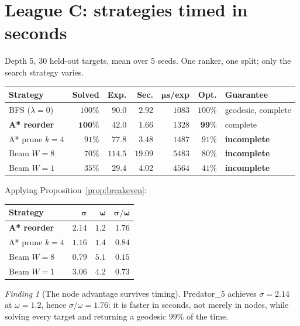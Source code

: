 \documentclass[11pt]{article}
\theoremstyle{plain}
\theoremstyle{definition}
\theoremstyle{remark}
\newtheorem{finding}{Finding}
\begin{document}
\section{League C: strategies timed in seconds}
\label{sec:leagueC}

Depth 5, 30 held-out targets, mean over 5 seeds. One ranker, one split; only the
search strategy varies.

\begin{center}
\small
\begin{tabular}{lrrrrrl}
\toprule
\textbf{Strategy} & \textbf{Solved} & \textbf{Exp.} & \textbf{Sec.} &
$\boldsymbol{\mu s}$\textbf{/exp} & \textbf{Opt.} & \textbf{Guarantee} \\
\midrule
BFS ($\lambda=0$) & $100\%$ & $90.0$ & $2.92$ & $1083$ & $100\%$ & geodesic, complete \\
\textbf{A* reorder} & $\mathbf{100\%}$ & $\mathbf{42.0}$ & $\mathbf{1.66}$ &
$1328$ & $\mathbf{99\%}$ & complete \\
A* prune $k{=}4$ & $91\%$ & $77.8$ & $3.48$ & $1487$ & $91\%$ & \textbf{incomplete} \\
Beam $W{=}8$ & $70\%$ & $114.5$ & $19.09$ & $5483$ & $80\%$ & \textbf{incomplete} \\
Beam $W{=}1$ & $35\%$ & $29.4$ & $4.02$ & $4564$ & $41\%$ & \textbf{incomplete} \\
\bottomrule
\end{tabular}
\end{center}

Applying Proposition~\ref{prop:breakeven}:

\begin{center}
\small
\begin{tabular}{lrrr}
\toprule
\textbf{Strategy} & $\boldsymbol{\sigma}$ & $\boldsymbol{\omega}$ &
$\boldsymbol{\sigma/\omega}$ \\
\midrule
\textbf{A* reorder} & $2.14$ & $1.2$ & $\mathbf{1.76}$ \\
A* prune $k{=}4$ & $1.16$ & $1.4$ & $0.84$ \\
Beam $W{=}8$ & $0.79$ & $5.1$ & $0.15$ \\
Beam $W{=}1$ & $3.06$ & $4.2$ & $0.73$ \\
\bottomrule
\end{tabular}
\end{center}

\begin{finding}[The node advantage survives timing]
Predator\_5 achieves $\sigma = 2.14$ at $\omega = 1.2$, hence
$\sigma/\omega = 1.76$: it is faster in seconds, not merely in nodes, while
solving every target and returning a geodesic $99\%$ of the time.
\end{finding}
\end{document}
